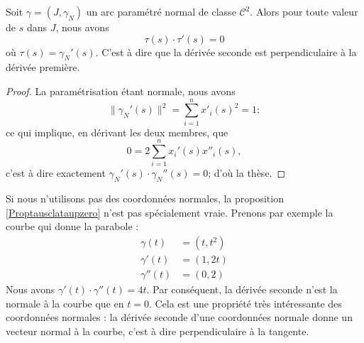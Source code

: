 \begin{proposition}     \label{Proptausclataupzero}
    Soit $\gamma=(J,\gamma_N)$ un arc paramétré normal de classe $\mathcal{C}^2$. Alors pour toute valeur de $s$ dans $J$, nous avons
    \begin{equation}
        \tau(s)\cdot\tau'(s)=0
    \end{equation}
    où $\tau(s)=\gamma_N'(s)$. C'est à dire que la dérivée seconde est perpendiculaire à la dérivée première.
\end{proposition}

\begin{proof}
    La paramétrisation étant normale, nous avons 
    \begin{equation}
        \| \gamma_N'(s) \|^2=\sum_{i=1}^nx'_i(s)^2=1;
    \end{equation}
    ce qui implique, en dérivant les deux membres, que
    \begin{equation}
        0=2\sum_{i=1}^nx_i'(s)x''_i(s),
    \end{equation}
    c'est à dire exactement $\gamma_N'(s)\cdot \gamma_N''(s)=0$; d'où la thèse.
\end{proof}

\begin{remark}
    Si nous n'utilisons pas des coordonnées normales, la proposition \ref{Proptausclataupzero} n'est pas spécialement vraie. Prenons par exemple la courbe qui donne la parabole :
    \begin{subequations}
        \begin{align}
            \gamma(t)&=(t,t^2)\\
            \gamma'(t)&=(1,2t)\\
            \gamma''(t)&=(0,2)
        \end{align}
    \end{subequations}
    Nous avons $\gamma'(t)\cdot \gamma''(t)=4t$. Par conséquent, la dérivée seconde n'est la normale à la courbe que en $t=0$. Cela est une propriété très intéressante des coordonnées normales : la dérivée seconde d'une coordonnées normale donne un vecteur normal à la courbe, c'est à dire perpendiculaire à la tangente.
\end{remark}

